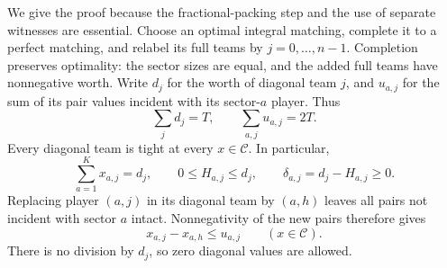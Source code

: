 \documentclass[11pt]{article}
\theoremstyle{remark}
\newcommand{\core}{\mathcal C}
\begin{document}
We give the proof because the fractional-packing step and the use of
separate witnesses are essential. Choose an optimal integral matching,
complete it to a perfect matching, and relabel its full teams by
$j=0,\ldots,n-1$. Completion preserves optimality: the sector sizes are
equal, and the added full teams have nonnegative worth. Write $d_j$ for
the worth of diagonal team $j$, and $u_{a,j}$ for the sum of its pair
values incident with its sector-$a$ player. Thus
\begin{equation}\label{four:budgets}
       \sum_j d_j=T,\qquad \sum_{a,j}u_{a,j}=2T.
\end{equation}
Every diagonal team is tight at every $x\in\core$. In particular,
\[
   \sum_{a=1}^Kx_{a,j}=d_j,\qquad
   0\le H_{a,j}\le d_j,\qquad
   \delta_{a,j}=d_j-H_{a,j}\ge0.
\]
Replacing player $(a,j)$ in its diagonal team by $(a,h)$ leaves all
pairs not incident with sector $a$ intact. Nonnegativity of the new
pairs therefore gives
\begin{equation}\label{four:range}
             x_{a,j}-x_{a,h}\le u_{a,j}
             \qquad(x\in\core).
\end{equation}
There is no division by $d_j$, so zero diagonal values are allowed.
\end{document}
